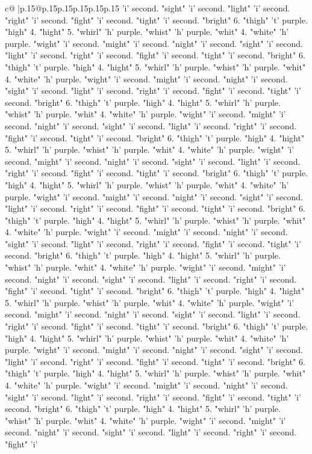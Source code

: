 \documentclass{article}
\begin{document}
{\begin{supertabular}{c@{$\;$}|p{.15\linewidth}@{}p{.15\linewidth}p{.15\linewidth}p{.15\linewidth}p{.15\linewidth}p{.15\linewidth}}
{{{'i' second. "sight" 'i' second. "light" 'i' second. "right" 'i' second. "fight" 'i' second. "tight" 'i' second. "bright" 6. "thigh" 't' purple. "high" 4. "hight" 5. "whirl" 'h' purple. "whist" 'h' purple. "whit" 4. "white" 'h' purple. "wight" 'i' second. "might" 'i' second. "night" 'i' second. "sight" 'i' second. "light" 'i' second. "right" 'i' second. "fight" 'i' second. "tight" 'i' second. "bright" 6. "thigh" 't' purple. "high" 4. "hight" 5. "whirl" 'h' purple. "whist" 'h' purple. "whit" 4. "white" 'h' purple. "wight" 'i' second. "might" 'i' second. "night" 'i' second. "sight" 'i' second. "light" 'i' second. "right" 'i' second. "fight" 'i' second. "tight" 'i' second. "bright" 6. "thigh" 't' purple. "high" 4. "hight" 5. "whirl" 'h' purple. "whist" 'h' purple. "whit" 4. "white" 'h' purple. "wight" 'i' second. "might" 'i' second. "night" 'i' second. "sight" 'i' second. "light" 'i' second. "right" 'i' second. "fight" 'i' second. "tight" 'i' second. "bright" 6. "thigh" 't' purple. "high" 4. "hight" 5. "whirl" 'h' purple. "whist" 'h' purple. "whit" 4. "white" 'h' purple. "wight" 'i' second. "might" 'i' second. "night" 'i' second. "sight" 'i' second. "light" 'i' second. "right" 'i' second. "fight" 'i' second. "tight" 'i' second. "bright" 6. "thigh" 't' purple. "high" 4. "hight" 5. "whirl" 'h' purple. "whist" 'h' purple. "whit" 4. "white" 'h' purple. "wight" 'i' second. "might" 'i' second. "night" 'i' second. "sight" 'i' second. "light" 'i' second. "right" 'i' second. "fight" 'i' second. "tight" 'i' second. "bright" 6. "thigh" 't' purple. "high" 4. "hight" 5. "whirl" 'h' purple. "whist" 'h' purple. "whit" 4. "white" 'h' purple. "wight" 'i' second. "might" 'i' second. "night" 'i' second. "sight" 'i' second. "light" 'i' second. "right" 'i' second. "fight" 'i' second. "tight" 'i' second. "bright" 6. "thigh" 't' purple. "high" 4. "hight" 5. "whirl" 'h' purple. "whist" 'h' purple. "whit" 4. "white" 'h' purple. "wight" 'i' second. "might" 'i' second. "night" 'i' second. "sight" 'i' second. "light" 'i' second. "right" 'i' second. "fight" 'i' second. "tight" 'i' second. "bright" 6. "thigh" 't' purple. "high" 4. "hight" 5. "whirl" 'h' purple. "whist" 'h' purple. "whit" 4. "white" 'h' purple. "wight" 'i' second. "might" 'i' second. "night" 'i' second. "sight" 'i' second. "light" 'i' second. "right" 'i' second. "fight" 'i' second. "tight" 'i' second. "bright" 6. "thigh" 't' purple. "high" 4. "hight" 5. "whirl" 'h' purple. "whist" 'h' purple. "whit" 4. "white" 'h' purple. "wight" 'i' second. "might" 'i' second. "night" 'i' second. "sight" 'i' second. "light" 'i' second. "right" 'i' second. "fight" 'i' second. "tight" 'i' second. "bright" 6. "thigh" 't' purple. "high" 4. "hight" 5. "whirl" 'h' purple. "whist" 'h' purple. "whit" 4. "white" 'h' purple. "wight" 'i' second. "might" 'i' second. "night" 'i' second. "sight" 'i' second. "light" 'i' second. "right" 'i' second. "fight" 'i' second. "tight" 'i' second. "bright" 6. "thigh" 't' purple. "high" 4. "hight" 5. "whirl" 'h' purple. "whist" 'h' purple. "whit" 4. "white" 'h' purple. "wight" 'i' second. "might" 'i' second. "night" 'i' second. "sight" 'i' second. "light" 'i' second. "right" 'i' second. "fight" 'i' }}}
\end{supertabular}}
\end{document}
